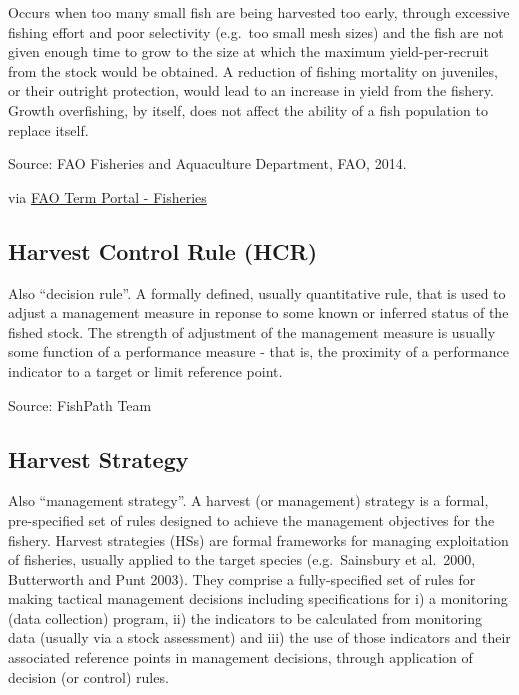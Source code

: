 \documentclass[
  11pt,
]{book}
\begin{document}
Occurs when too many small fish are being harvested too early, through excessive fishing effort and poor selectivity (e.g.~too small mesh sizes) and the fish are not given enough time to grow to the size at which the maximum yield-per-recruit from the stock would be obtained. A reduction of fishing mortality on juveniles, or their outright protection, would lead to an increase in yield from the fishery. Growth overfishing, by itself, does not affect the ability of a fish population to replace itself.

Source: FAO Fisheries and Aquaculture Department, FAO, 2014.

via \href{http://www.fao.org/fishery/glossary/en}{FAO Term Portal - Fisheries}

\hypertarget{harvest-control-rule-hcr}{%
\subsection{Harvest Control Rule (HCR)}\label{harvest-control-rule-hcr}}

Also ``decision rule''. A formally defined, usually quantitative rule, that is used to adjust a management measure in reponse to some known or inferred status of the fished stock. The strength of adjustment of the management measure is usually some function of a performance measure - that is, the proximity of a performance indicator to a target or limit reference point.

Source: FishPath Team

\hypertarget{harvest-strategy}{%
\subsection{Harvest Strategy}\label{harvest-strategy}}

Also ``management strategy''. A harvest (or management) strategy is a formal, pre-specified set of rules designed to achieve the management objectives for the fishery. Harvest strategies (HSs) are formal frameworks for managing exploitation of fisheries, usually applied to the target species (e.g.~Sainsbury et al.~2000, Butterworth and Punt 2003). They comprise a fully-specified set of rules for making tactical management decisions including specifications for i) a monitoring (data collection) program, ii) the indicators to be calculated from monitoring data (usually via a stock assessment) and iii) the use of those indicators and their associated reference points in management decisions, through application of decision (or control) rules.
\end{document}
